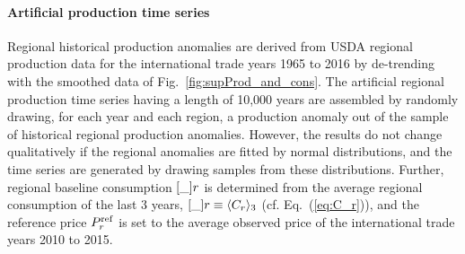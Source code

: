\paragraph{Artificial production time series}
Regional historical production anomalies are derived from USDA regional production data for the
international trade years 1965 to 2016 by de-trending with the smoothed data of Fig.~\ref{fig:supProd_and_cons}. The
artificial regional production time series having a length of 10,000 years are assembled by
randomly drawing, for each year and each region, a production anomaly out of the sample of
historical regional production anomalies. However, the results do not change qualitatively if the
regional anomalies are fitted by normal distributions, and the time series are generated by drawing
samples from these distributions. Further, regional baseline consumption $\Cref_r$ is determined
from the average regional consumption of the last 3 years, $\Cref_r\equiv \langle C_r\rangle_3$
(cf. Eq.~(\ref{eq:C_r})), and the reference price $P^{\operatorname{ref}}_r$ is set to the average observed price of
the international trade years 2010 to 2015.

